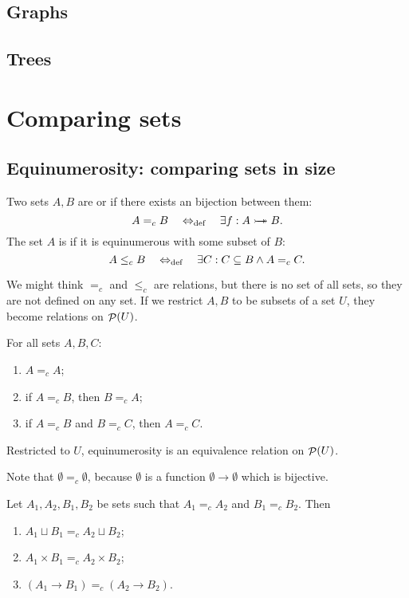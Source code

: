\section{Graphs}
\section{Trees}

\chapter{Comparing sets}
\section{Equinumerosity: comparing sets in size}
\begin{definition}
Two sets $A,B$ are  or  if there exists an bijection between them:
\[ A =_c B \quad\Leftrightarrow_{\text{def}}\quad \exists f: A\mathrel{\rightarrowtail\kern-1.9ex\twoheadrightarrow} B. \]
The set $A$ is  if it is equinumerous with some subset of $B$:
\[ A \leq_c B \quad\Leftrightarrow_{\text{def}}\quad \exists C: C\subseteq B \land A=_c C. \]
\end{definition}
We might think $=_c$ and $\leq_c$ are relations, but there is no set of all sets, so they are not defined on any set. If we restrict $A,B$ to be subsets of a set $U$, they become relations on $\mathop{\mathcal{P}}(U)$.
\begin{proposition}
For all sets $A,B,C$:
\begin{enumerate}
\item $A =_c A$;
\item if $A=_c B$, then $B =_c A$;
\item if $A=_c B$ and $B =_c C$, then $A =_c C$.
\end{enumerate}
Restricted to $U$, equinumerosity is an equivalence relation on $\mathop{\mathcal{P}}(U)$.
\end{proposition}

Note that $\emptyset =_c \emptyset$, because $\emptyset$ is a function $\emptyset\to \emptyset$ which is bijective.

\begin{lemma} \label{lemma:welldefinedCardinalArithemtic}
Let $A_1,A_2,B_1,B_2$ be sets such that $A_1=_c A_2$ and $B_1=_cB_2$. Then
\begin{enumerate}
\item $A_1 \sqcup B_1 =_c A_2\sqcup B_2$;
\item $A_1 \times B_1 =_c A_2\times B_2$;
\item $(A_1\to B_1) =_c (A_2\to B_2)$.
\end{enumerate}
\end{lemma}

